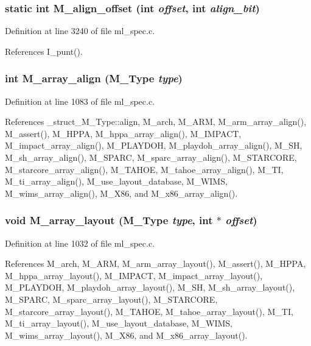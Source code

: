 \subsubsection{\setlength{\rightskip}{0pt plus 5cm}static int M\_\-align\_\-offset (int {\em offset}, int {\em align\_\-bit})\hspace{0.3cm}{\tt  [static]}}\label{ml__spec_8c_ad6bf5b83fe0b3c9e4cda1c22a10ed61}




Definition at line 3240 of file ml\_\-spec.c.

References I\_\-punt().
\subsubsection{\setlength{\rightskip}{0pt plus 5cm}int M\_\-array\_\-align (\bf{M\_\-Type} {\em type})}\label{ml__spec_8c_6fefcf5f802153eb7f0249f69485de0c}




Definition at line 1083 of file ml\_\-spec.c.

References \_\-struct\_\-M\_\-Type::align, M\_\-arch, M\_\-ARM, M\_\-arm\_\-array\_\-align(), M\_\-assert(), M\_\-HPPA, M\_\-hppa\_\-array\_\-align(), M\_\-IMPACT, M\_\-impact\_\-array\_\-align(), M\_\-PLAYDOH, M\_\-playdoh\_\-array\_\-align(), M\_\-SH, M\_\-sh\_\-array\_\-align(), M\_\-SPARC, M\_\-sparc\_\-array\_\-align(), M\_\-STARCORE, M\_\-starcore\_\-array\_\-align(), M\_\-TAHOE, M\_\-tahoe\_\-array\_\-align(), M\_\-TI, M\_\-ti\_\-array\_\-align(), M\_\-use\_\-layout\_\-database, M\_\-WIMS, M\_\-wims\_\-array\_\-align(), M\_\-X86, and M\_\-x86\_\-array\_\-align().
\subsubsection{\setlength{\rightskip}{0pt plus 5cm}void M\_\-array\_\-layout (\bf{M\_\-Type} {\em type}, int $\ast$ {\em offset})}\label{ml__spec_8c_2002127b5a95a8db3fdfc991c73ef83a}




Definition at line 1032 of file ml\_\-spec.c.

References M\_\-arch, M\_\-ARM, M\_\-arm\_\-array\_\-layout(), M\_\-assert(), M\_\-HPPA, M\_\-hppa\_\-array\_\-layout(), M\_\-IMPACT, M\_\-impact\_\-array\_\-layout(), M\_\-PLAYDOH, M\_\-playdoh\_\-array\_\-layout(), M\_\-SH, M\_\-sh\_\-array\_\-layout(), M\_\-SPARC, M\_\-sparc\_\-array\_\-layout(), M\_\-STARCORE, M\_\-starcore\_\-array\_\-layout(), M\_\-TAHOE, M\_\-tahoe\_\-array\_\-layout(), M\_\-TI, M\_\-ti\_\-array\_\-layout(), M\_\-use\_\-layout\_\-database, M\_\-WIMS, M\_\-wims\_\-array\_\-layout(), M\_\-X86, and M\_\-x86\_\-array\_\-layout().
